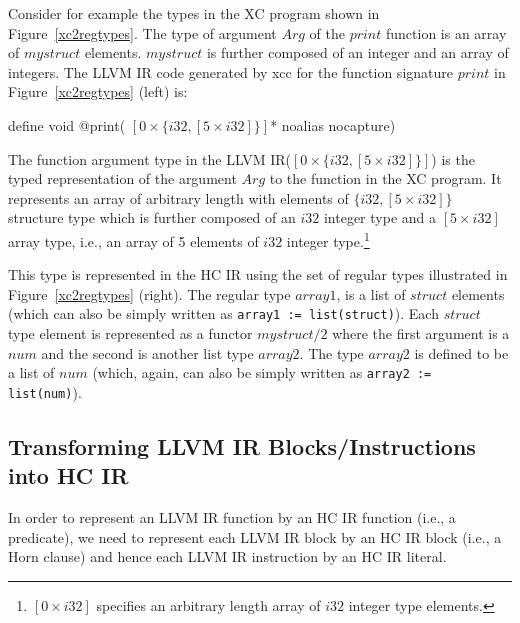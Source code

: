 \documentclass{llncs}
\newcommand{\hcir}{HC IR\xspace}
\newcommand{\llvmir}{LLVM IR\xspace}
\begin{document}
Consider for example the types in the XC program shown in
Figure~\ref{xc2regtypes}.  The type of argument $Arg$ of the $print$
function is an array of $mystruct$ elements. $mystruct$ is further
composed of an integer and an array of integers.  The \llvmir
code generated by xcc for the function signature $print$ in Figure~\ref{xc2regtypes} (left) is:
\vspace{-1mm}
\begin{center}
define void @print( $[0 \times \{ i32, [5 \times i32] \}]$* noalias nocapture)
\end{center}
\vspace{-1mm}
The function argument type in the \llvmir ($[0 \times \{ i32, [5
\times i32] \}]$) is the typed representation of the argument $Arg$ to
the function in the XC program. It represents an array of arbitrary length with 
 elements of $\{ i32, [5 \times i32] \}$ structure type which is further
composed of an $i32$ integer type and a $[5 \times i32]$ array type,
i.e., an array of 5 elements of $i32$ integer type.\footnote{$[0 \times i32]$ specifies an arbitrary length array of $i32$ integer type elements. }

This type is represented in the \hcir using the set of regular types
illustrated in Figure~\ref{xc2regtypes} (right). The regular type $array1$,
is a list of $struct$ elements (which can also be simply written as
\texttt{array1 := list(struct)}). Each $struct$ type element is
represented as a functor $mystruct/2$ where the first argument is a
$num$ and the second is another list type $array2$.  The type $array2$
is defined to be a list of $num$ (which, again, can also be simply
written as \texttt{array2 := list(num)}).

\subsection{Transforming \llvmir Blocks/Instructions into \hcir}
\label{sec:llvm2isa-block-trans}

In order to represent an \llvmir function by an \hcir
function (i.e., a predicate), we need to represent each \llvmir block by an \hcir block
(i.e., a Horn clause) and hence each \llvmir instruction by an \hcir
literal.
\end{document}
